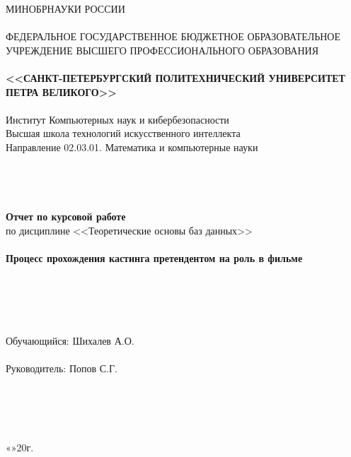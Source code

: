 \documentclass[11pt,a4paper,final]{article} %
\begin{document}
	\thispagestyle{empty}
	
	\begin{center}
		{\Large МИНОБРНАУКИ РОССИИ}\\
		~\\
		{\large ФЕДЕРАЛЬНОЕ ГОСУДАРСТВЕННОЕ БЮДЖЕТНОЕ ОБРАЗОВАТЕЛЬНОЕ УЧРЕЖДЕНИЕ ВЫСШЕГО ПРОФЕССИОНАЛЬНОГО ОБРАЗОВАНИЯ}\\
		~\\
		{\Large \bf <<САНКТ-ПЕТЕРБУРГСКИЙ ПОЛИТЕХНИЧЕСКИЙ УНИВЕРСИТЕТ ПЕТРА ВЕЛИКОГО>>}\\
		~\\
		{\large Институт Компьютерных наук и кибербезопасности }\\
		{\large Высшая школа технологий искусственного интеллекта}\\
		{\large Направление 02.03.01. Математика и компьютерные науки}\\
		~\\
		~\\
		~\\
		~\\
		{ {\LARGE \bf Отчет по курсовой работе}}\\
		\vspace{3mm}
		{\Large {по дисциплине <<Теоретические основы баз данных>>}}\\
		~\\
		{\Large \bf Процесс прохождения кастинга претендентом на роль в фильме }\\
		~\\
		~\\
		~\\
		~\\
		~\\
		{\large Обучающийся: \underline{\hspace{3.5cm}} \hspace{12mm} Шихалев А.О.}\\
		~\\
		{\large Руководитель: \underline{\hspace{3.5cm}} \hspace{12mm} Попов С.Г.}\\
		~\\
		~\\
		~\\
		~\\
	\end{center}
	\begin{flushright}
		
		«\underline{\hspace{1cm}}»\underline{\hspace{3cm}}20\underline{\hspace{0.7cm}}г.
	\end{flushright}
	~\\
	~\\
	
\end{document}
